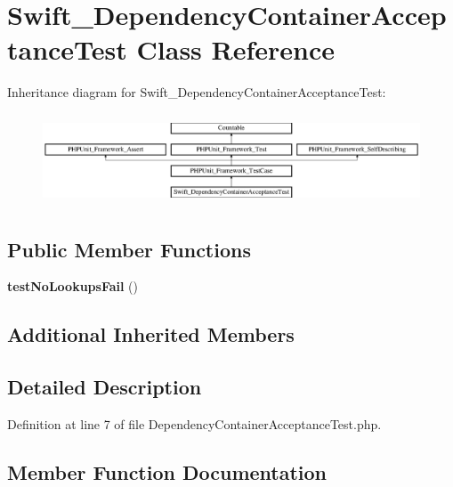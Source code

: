 \section{Swift\+\_\+\+Dependency\+Container\+Acceptance\+Test Class Reference}
\label{class_swift___dependency_container_acceptance_test}
Inheritance diagram for Swift\+\_\+\+Dependency\+Container\+Acceptance\+Test\+:\begin{figure}[H]
\begin{center}
\leavevmode
\includegraphics[height=2.745098cm]{class_swift___dependency_container_acceptance_test}
\end{center}
\end{figure}
\subsection*{Public Member Functions}
\begin{DoxyCompactItemize}
\item 
{\bf test\+No\+Lookups\+Fail} ()
\end{DoxyCompactItemize}
\subsection*{Additional Inherited Members}


\subsection{Detailed Description}


Definition at line 7 of file Dependency\+Container\+Acceptance\+Test.\+php.



\subsection{Member Function Documentation}
